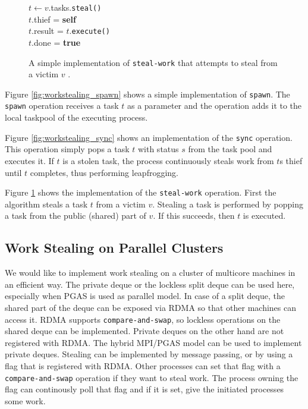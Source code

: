 \begin{figure}
	\centering
	\begin{algorithm}[H]
		\SetStartEndCondition{ }{}{}%
		\AlgoDontDisplayBlockMarkers\SetAlgoNoEnd\SetAlgoNoLine%

		 {
			$t \gets v$.tasks.\texttt{steal()} \\
			 {
				$t$.thief = \textbf{self} \\
				$t$.result = $t$.\texttt{execute()} \\
				$t$.done = \textbf{true}
			}
		}
	\end{algorithm}

	\caption{A simple implementation of \texttt{steal-work} that attempts to steal from a victim $v$ \cite{lace}.}
	\label{fig:workstealing_steal}
\end{figure}

Figure \ref{fig:workstealing_spawn} shows a simple implementation of \texttt{spawn}. The \texttt{spawn} operation receives a task $t$ as a parameter and the operation adds it to the local taskpool of the executing process. 

Figure \ref{fig:workstealing_sync} shows an implementation of the \texttt{sync} operation. This operation simply pops a task $t$ with status $s$ from the task pool and executes it. If $t$ is a stolen task, the process continuously steals work from $t$s thief until $t$ completes, thus performing leapfrogging. 

Figure \ref{fig:workstealing_steal} shows the implementation of the \texttt{steal-work} operation. First the algorithm steals a task $t$ from a victim $v$. Stealing a task is performed by popping a task from the public (shared) part of $v$. If this succeeds, then $t$ is executed.

\subsection{Work Stealing on Parallel Clusters}
We would like to implement work stealing on a cluster of multicore machines in an efficient way. The private deque or the lockless split deque can be used here, especially when PGAS is used as parallel model. In case of a split deque, the shared part of the deque can be exposed via RDMA so that other machines can access it. RDMA supports \texttt{compare-and-swap}, so lockless operations on the shared deque can be implemented. Private deques on the other hand are not registered with RDMA. The hybrid MPI/PGAS model can be used to implement private deques. Stealing can be implemented by message passing, or by using a flag that is registered with RDMA. Other processes can set that flag with a \texttt{compare-and-swap} operation if they want to steal work. The process owning the flag can continously poll that flag and if it is set, give the initiated processes some work.

